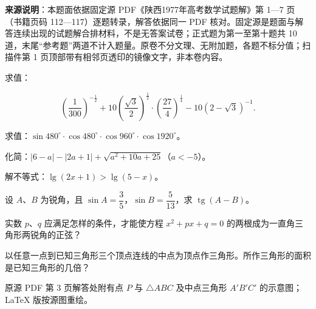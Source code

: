 


\begin{gktip}
\textbf{来源说明}：本题面依据固定源 PDF《陕西1977年高考数学试题解》第 1—7 页（书籍页码 112—117）逐题转录，解答依据同一 PDF 核对。固定源是题面与解答连续出现的试题解合排材料，不是无答案试卷；正式题为第一至第十题共 10 道，末尾“参考题”两道不计入题量。原卷不分文理、无附加题，各题不标分值；扫描件第 1 页顶部带有相邻页透印的镜像文字，非本卷内容。
\end{gktip}

\par\medskip

\begin{question}
求值：

\nopagebreak[4]
\[
\left(\frac{1}{300}\right)^{-\frac12}
+10\left(\frac{\sqrt3}{2}\right)^{\frac12}\cdot\left(\frac{27}{4}\right)^{\frac14}
-10(2-\sqrt3)^{-1}.
\]

\end{question}
\begin{question}
求值：$\sin480^\circ\cdot\cos480^\circ\cdot\cos960^\circ\cdot\cos1920^\circ$。

\end{question}
\begin{question}
化简：$|6-a|-|2a+1|+\sqrt{a^2+10a+25}$（$a<-5$）。

\end{question}
\begin{question}
解不等式：$\lg(2x+1)>\lg(5-x)$。

\end{question}
\begin{question}
设 $A\text{、}B$ 为锐角，且 $\sin A=\dfrac35$，$\sin B=\dfrac5{13}$，求 $\operatorname{tg}(A-B)$。

\end{question}
\begin{question}
实数 $p\text{、}q$ 应满足怎样的条件，才能使方程 $x^2+px+q=0$ 的两根成为一直角三角形两锐角的正弦？

\Needspace{0.4\textheight}
\end{question}
\begin{question}
以任意一点到已知三角形三个顶点连线的中点为顶点作三角形。所作三角形的面积是已知三角形的几倍？

\begin{gktip}
原源 PDF 第 3 页解答处附有点 $P$ 与 $\triangle ABC$ 及中点三角形 $A'B'C'$ 的示意图；LaTeX 版按源图重绘。
\end{gktip}
\nopagebreak[4]
\begin{center}\end{center}
\nopagebreak[4]
\end{question}

